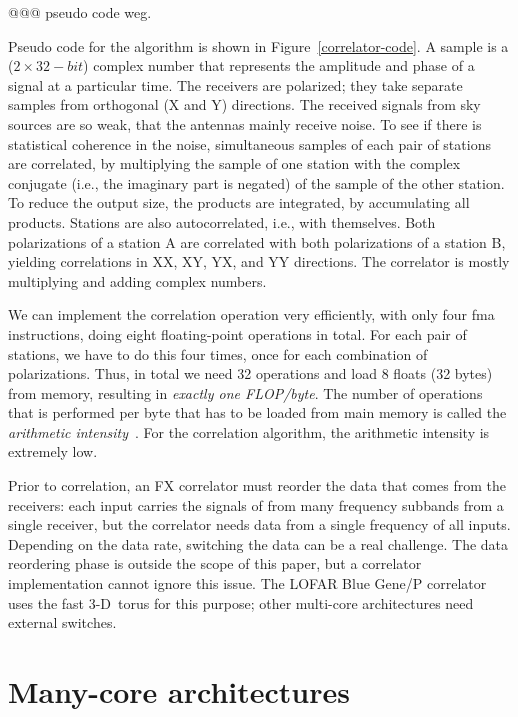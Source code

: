 \documentclass{article}
\begin{document}
@@@ pseudo code weg.

Pseudo code for the algorithm is shown in Figure~\ref{correlator-code}.
A sample is a ($2 \times 32-bit$) complex number that represents the
amplitude and phase of a signal at a particular time. The receivers
are polarized; they take separate samples from orthogonal (X and Y)
directions. The received signals from sky sources are so weak, that the antennas 
mainly receive noise. To see if there is statistical coherence
in the noise, simultaneous samples of each pair of stations are correlated, 
by multiplying the sample of one station with the complex
conjugate (i.e., the imaginary part is negated) of the sample of the other station.
To reduce the output size, the products are integrated, by accumulating all products. 
Stations are also autocorrelated, i.e., with
themselves. Both polarizations of a station A are correlated with both polarizations 
of a station B, yielding correlations in XX, XY, YX, and YY
directions.
The correlator is mostly multiplying and adding complex numbers.

We can implement the correlation operation very efficiently, with only
four fma instructions, doing eight floating-point operations in
total. For each pair of stations, we have to do this four times, once
for each combination of polarizations. Thus, in total we need 32
operations and load 8 floats (32 bytes) from memory, resulting in \emph{exactly
  one FLOP/byte}.  The number of operations that is performed per byte
that has to be loaded from main memory is called the \emph{arithmetic
  intensity}~\cite{system-performance}. For the correlation algorithm,
the arithmetic intensity is extremely low.



Prior to correlation, an FX correlator must reorder the data that comes from
the receivers:
each input carries the signals of from many frequency subbands from a single
receiver, but the correlator needs data from a single frequency of all inputs.
Depending on the data rate, switching the data can be a real challenge.
The data reordering phase is outside the scope of this paper, but a correlator
implementation cannot ignore this issue.
The LOFAR Blue Gene/P correlator uses the fast 3-D~torus for this purpose;
other multi-core architectures need external switches.


\section{Many-core architectures}
\end{document}
